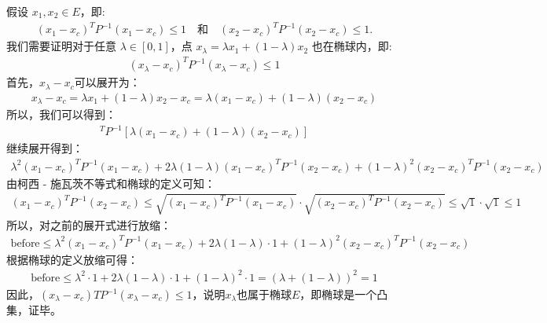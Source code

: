 \documentclass[UTF8]{ctexart}
\begin{document}
\begin{enumerate}
		假设 \(x_1, x_2 \in E\)，即:
		\begin{align*}
			(x_1 - x_c)^T P^{-1} (x_1 - x_c) \leq 1 \quad \text{和} \quad (x_2 - x_c)^T P^{-1} (x_2 - x_c) \leq 1.
		\end{align*}
		我们需要证明对于任意 \(\lambda \in [0, 1]\)，点 \(x_\lambda = \lambda x_1 + (1 - \lambda) x_2\) 也在椭球内，即:
		\begin{align*}
			(x_\lambda - x_c)^T P^{-1} (x_\lambda - x_c) \leq 1
		\end{align*}
		首先，\(x_\lambda - x_c\)可以展开为：
		\begin{align*}
			x_\lambda - x_c = \lambda x_1+(1-\lambda) x_2-x_c = \lambda (x_1 - x_c) + (1 - \lambda) (x_2 - x_c)
		\end{align*}
		所以，我们可以得到：
		\begin{align*}
			[\lambda(x_1 - x_c) + (1 - \lambda)(x_2 - x_c)]^T P^{-1} [\lambda(x_1 - x_c) + (1 - \lambda)(x_2 - x_c)]
		\end{align*}
		继续展开得到：
		\begin{align*}
			\lambda^2(x_1 - x_c)^T P^{-1}(x_1 - x_c) + 2\lambda (1 - \lambda) (x_1 - x_c)^T P^{-1}(x_2 - x_c) + (1 - \lambda)^2 (x_2 - x_c)^T P^{-1}(x_2 - x_c)
		\end{align*}
		由柯西 - 施瓦茨不等式和椭球的定义可知：
		\begin{align*}
			(x_1 - x_c)^T P^{-1} (x_2 - x_c) \leq \sqrt{(x_1 - x_c)^T P^{-1} (x_1 - x_c)} \cdot \sqrt{(x_2 - x_c)^T P^{-1} (x_2 - x_c)} \leq \sqrt{1} \cdot \sqrt{1} \leq 1
		\end{align*}
		所以，对之前的展开式进行放缩：
		\begin{align*}
			\text{before} \leq \lambda^2(x_1 - x_c)^T P^{-1}(x_1 - x_c) + 2\lambda(1 - \lambda) \cdot 1 + (1 - \lambda)^2(x_2 - x_c)^T P^{-1}(x_2 - x_c)
		\end{align*}
		根据椭球的定义放缩可得：
		\begin{align*}
			\text{before} \leq \lambda^2 \cdot 1 + 2\lambda (1 - \lambda) \cdot 1 + (1 - \lambda)^2 \cdot 1 = (\lambda + (1 - \lambda))^2 = 1
		\end{align*}
		因此，\((x_\lambda - x_c) T P^{-1} (x_\lambda - x_c) \leq 1\)，说明\(x_\lambda\)也属于椭球\(E\)，即椭球是一个凸集，证毕。






	\end{enumerate}
\end{document}
